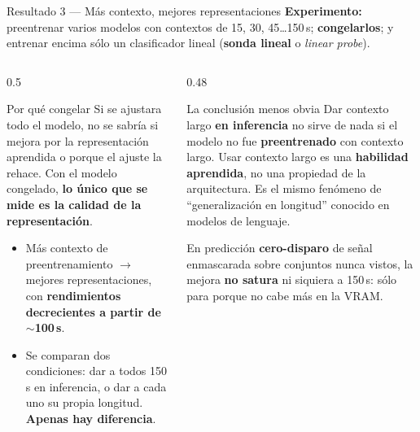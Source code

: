 \documentclass[aspectratio=169,10pt]{beamer}
\newcommand{\term}[1]{\textbf{\color{deepgreen}#1}}
\newcommand{\eng}[1]{{\itshape\color{muted}#1}}
\begin{document}
\begin{frame}[c]{Resultado 3 --- Más contexto, mejores representaciones}
  \small
  \textbf{Experimento:} preentrenar varios modelos con contextos de 15, 30, 45\ldots 150\,s; \term{congelarlos}; y entrenar encima sólo un clasificador lineal (\term{sonda lineal} o \eng{linear probe}).
  \vspace{1mm}
  \begin{columns}[t,totalwidth=\linewidth]
    \begin{column}{0.5\linewidth}
      \begin{block}{Por qué congelar}
        \footnotesize Si se ajustara todo el modelo, no se sabría si mejora por la representación aprendida o porque el ajuste la rehace. Con el modelo congelado, \term{lo único que se mide es la calidad de la representación}.
      \end{block}
      \vspace{1mm}
      \begin{itemize}\footnotesize
        \item Más contexto de preentrenamiento $\rightarrow$ mejores representaciones, con \term{rendimientos decrecientes a partir de $\sim$100\,s}.
        \item Se comparan dos condiciones: dar a todos 150\,s en inferencia, o dar a cada uno su propia longitud. \term{Apenas hay diferencia}.
      \end{itemize}
    \end{column}
    \begin{column}{0.48\linewidth}
      \begin{alertblock}{La conclusión menos obvia}
        \footnotesize Dar contexto largo \term{en inferencia} no sirve de nada si el modelo no fue \term{preentrenado} con contexto largo.
        \vspace{1.5mm}
        Usar contexto largo es una \term{habilidad aprendida}, no una propiedad de la arquitectura. Es el mismo fenómeno de ``generalización en longitud'' conocido en modelos de lenguaje.
      \end{alertblock}
      \vspace{1mm}
      {\footnotesize En predicción \term{cero-disparo} de señal enmascarada sobre conjuntos nunca vistos, la mejora \term{no satura} ni siquiera a 150\,s: sólo para porque no cabe más en la VRAM.}
    \end{column}
  \end{columns}
\end{frame}
\end{document}
